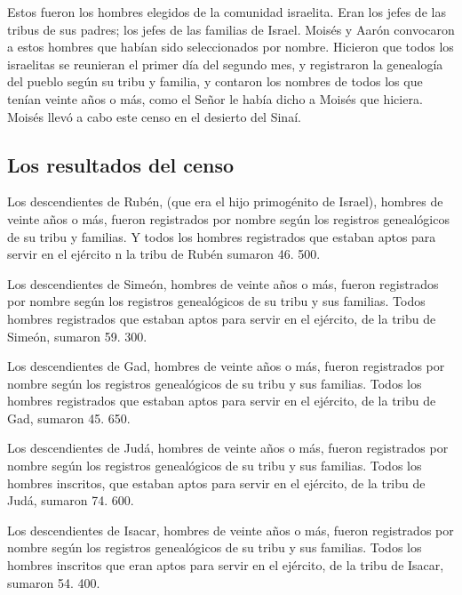  Estos fueron los hombres elegidos de la comunidad
israelita. Eran los jefes de las tribus de sus padres; los jefes de las
familias de Israel.  Moisés y Aarón convocaron a estos
hombres que habían sido seleccionados por nombre. 
Hicieron que todos los israelitas se reunieran el primer día del segundo
mes, y registraron la genealogía del pueblo según su tribu y familia, y
contaron los nombres de todos los que tenían veinte años o más,
 como el Señor le había dicho a Moisés que hiciera.
Moisés llevó a cabo este censo en el desierto del Sinaí.

\hypertarget{los-resultados-del-censo}{%
\subsection{Los resultados del censo}\label{los-resultados-del-censo}}

 Los descendientes de Rubén, (que era el hijo primogénito
de Israel), hombres de veinte años o más, fueron registrados por nombre
según los registros genealógicos de su tribu y familias. Y todos los
hombres registrados que estaban aptos para servir en el ejército
 n la tribu de Rubén sumaron 46. 500.

 Los descendientes de Simeón, hombres de veinte años o
más, fueron registrados por nombre según los registros genealógicos de
su tribu y sus familias. Todos hombres registrados que estaban aptos
para servir en el ejército,  de la tribu de Simeón,
sumaron 59. 300.

 Los descendientes de Gad, hombres de veinte años o más,
fueron registrados por nombre según los registros genealógicos de su
tribu y sus familias. Todos los hombres registrados que estaban aptos
para servir en el ejército,  de la tribu de Gad, sumaron
45. 650.

 Los descendientes de Judá, hombres de veinte años o más,
fueron registrados por nombre según los registros genealógicos de su
tribu y sus familias. Todos los hombres inscritos, que estaban aptos
para servir en el ejército,  de la tribu de Judá, sumaron
74. 600.

 Los descendientes de Isacar, hombres de veinte años o
más, fueron registrados por nombre según los registros genealógicos de
su tribu y sus familias. Todos los hombres inscritos que eran aptos para
servir en el ejército,  de la tribu de Isacar, sumaron
54. 400.

